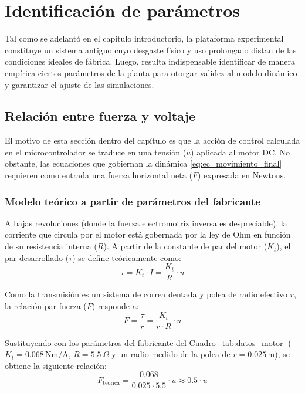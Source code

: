 \documentclass[11pt,fleqn]{book} %
\begin{document}
\section{Identificación de parámetros}
Tal como se adelantó en el capítulo introductorio, la plataforma experimental constituye un sistema antiguo cuyo desgaste físico y uso prolongado distan de las condiciones ideales de fábrica. Luego, resulta indispensable identificar de manera empírica ciertos parámetros de la planta para otorgar validez al modelo dinámico y garantizar el ajuste de las simulaciones. 

\subsection{Relación entre fuerza y voltaje}
\label{sub:fuerza_voltaje}

El motivo de esta sección dentro del capítulo es que la acción de control calculada en el microcontrolador se traduce en una tensión ($u$) aplicada al motor DC. No obstante, las ecuaciones que gobiernan la dinámica \ref{eq:ec_movimiento_final} requieren como entrada una fuerza horizontal neta ($F$) expresada en Newtons.

\subsubsection{Modelo teórico a partir de parámetros del fabricante}

A bajas revoluciones (donde la fuerza electromotriz inversa es despreciable), la corriente que circula por el motor está gobernada por la ley de Ohm en función de su resistencia interna ($R$). A partir de la constante de par del motor ($K_t$), el par  desarrollado ($\tau$) se define teóricamente como:
\begin{equation}
	\tau = K_t \cdot I = \frac{K_t}{R} \cdot u
\end{equation}

Como la transmisión  es un sistema de correa dentada y polea de radio efectivo $r$, la relación par-fuerza ($F$) responde a:
\begin{equation}
	F = \frac{\tau}{r} = \frac{K_t}{r \cdot R} \cdot u
\end{equation}

Sustituyendo con los parámetros del fabricante del Cuadro~\ref{tab:datos_motor} ($K_t = 0.068\,\text{Nm/A}$, $R = 5.5\,\Omega$ y un radio medido de la polea de $r = 0.025\,\text{m}$), se obtiene la siguiente relación:
\begin{equation}
	F_{\text{teórica}} = \frac{0.068}{0.025 \cdot 5.5} \cdot u \approx 0.5 \cdot u
\end{equation}
\end{document}
